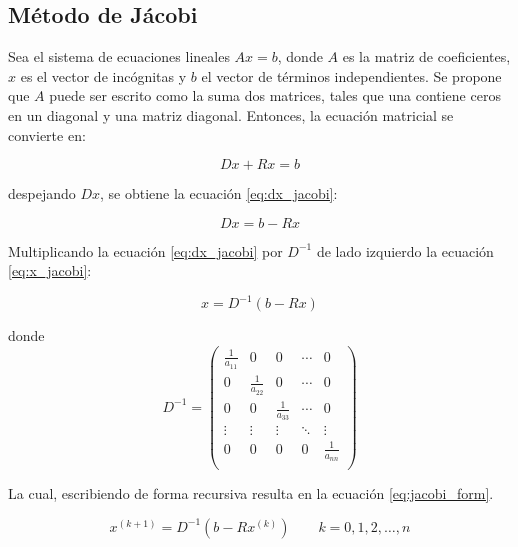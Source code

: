 \subsection{Método de Jácobi}

Sea el sistema de ecuaciones lineales $Ax=b$, donde $A$ es la matriz de coeficientes, $x$ es el vector de incógnitas y $b$ el vector de términos independientes. Se propone que $A$ puede ser escrito como la suma dos matrices, tales que una contiene ceros en un diagonal y una matriz diagonal. Entonces, la ecuación matricial se convierte en:

\begin{equation*}
    Dx+Rx = b
\end{equation*}

despejando $Dx$, se obtiene la ecuación \ref{eq:dx_jacobi}:

\begin{equation}
    Dx = b-Rx \label{eq:dx_jacobi}
\end{equation}

Multiplicando la ecuación \ref{eq:dx_jacobi} por $D^{-1}$ de lado izquierdo la ecuación \ref{eq:x_jacobi}:

\begin{equation}
    x= D^{-1}(b-Rx) \label{eq:x_jacobi}
\end{equation}

donde
\begin{equation*}
    D^{-1} =
    \begin{pmatrix}
        \frac{1}{a_{11}} & 0                & 0                & \cdots & 0                \\
        0                & \frac{1}{a_{22}} & 0                & \cdots & 0                \\
        0                & 0                & \frac{1}{a_{33}} & \cdots & 0                \\
        \vdots           & \vdots           & \vdots           & \ddots & \vdots           \\
        0                & 0                & 0                & 0      & \frac{1}{a_{nn}} \\
    \end{pmatrix}
\end{equation*}

La cual, escribiendo de forma recursiva resulta en la ecuación \ref{eq:jacobi_form}.

\begin{equation}
    x^{(k+1)}=D^{-1} (b-Rx^{(k)}) \qquad k=0,1,2,\dots,n \label{eq:jacobi_form}
\end{equation}


